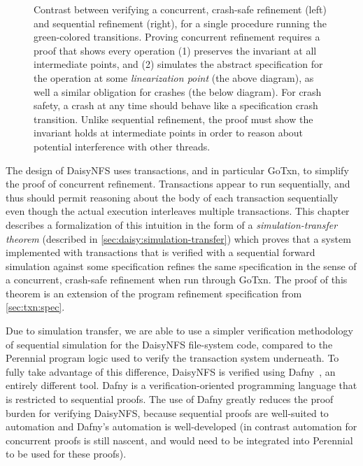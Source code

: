 \begin{figure}
\begin{subfigure}[m]{0.4\textwidth}
  \label{fig:refinement:seq}
  \end{subfigure}
  \vspace{0.5\baselineskip}
  \caption[Concurrent, crash-safe simulation vs sequential simulation]{Contrast between verifying a
    concurrent, crash-safe refinement (left) and sequential refinement (right), for a single
    procedure running the green-colored transitions. Proving concurrent
    refinement requires a proof that shows every operation (1) preserves the
    invariant at all intermediate points, and (2) simulates the abstract
    specification for the operation at some \emph{linearization point} (the
    above diagram), as well
    a similar obligation for crashes (the below diagram). For
    crash safety, a crash at any time should behave like a specification crash transition. Unlike
    sequential refinement, the proof must show the invariant holds at
    intermediate points in order to reason about potential interference with
    other threads.}

  \label{fig:concurrent-refinement}
\end{figure}


The design of DaisyNFS uses transactions, and in particular GoTxn, to simplify
the proof of concurrent refinement. Transactions appear to run
sequentially, and thus should permit reasoning about the body of each
transaction sequentially even though the actual execution interleaves multiple
transactions. This chapter describes a formalization of this intuition in the
form of a \emph{simulation-transfer theorem} (described in
\cref{sec:daisy:simulation-transfer}) which proves that a system implemented
with transactions that is verified with a sequential forward simulation against
some specification refines the same specification in the sense of a concurrent,
crash-safe refinement when run through GoTxn. The proof of this theorem is an
extension of the program refinement specification from \cref{sec:txn:spec}.

Due to simulation transfer, we are able to use a simpler verification
methodology of sequential simulation for the DaisyNFS file-system code, compared
to the Perennial program logic used to verify the transaction system underneath.
To fully take advantage of this difference, DaisyNFS is verified using
Dafny~\cite{leino:dafny}, an entirely different tool. Dafny is a
verification-oriented programming language that is restricted to sequential
proofs. The use of Dafny greatly reduces the proof burden for verifying
DaisyNFS, because sequential proofs are well-suited to automation and Dafny's
automation is well-developed (in contrast automation for concurrent proofs is
still nascent, and would need to be integrated into Perennial to be used for
these proofs).

